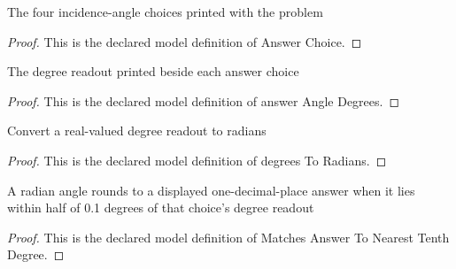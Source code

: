 \begin{definition}
  \label{def:physics:phyx-mini-0013:phyxminiproblems-problemphyxmini0013-answerchoice}
  The four incidence-angle choices printed with the problem
\end{definition}
\begin{proof}
  This is the declared model definition of Answer Choice.
\end{proof}
\begin{definition}
  \label{def:physics:phyx-mini-0013:phyxminiproblems-problemphyxmini0013-answerangledegrees}
  The degree readout printed beside each answer choice
\end{definition}
\begin{proof}
  This is the declared model definition of answer Angle Degrees.
\end{proof}
\begin{definition}
  \label{def:physics:phyx-mini-0013:phyxminiproblems-problemphyxmini0013-degreestoradians}
  Convert a real-valued degree readout to radians
\end{definition}
\begin{proof}
  This is the declared model definition of degrees To Radians.
\end{proof}
\begin{definition}
  \label{def:physics:phyx-mini-0013:phyxminiproblems-problemphyxmini0013-matchesanswertonearesttenthdegree}
  A radian angle rounds to a displayed one-decimal-place answer when it lies within half of 0.1 degrees of that choice's degree readout
\end{definition}
\begin{proof}
  This is the declared model definition of Matches Answer To Nearest Tenth Degree.
\end{proof}
